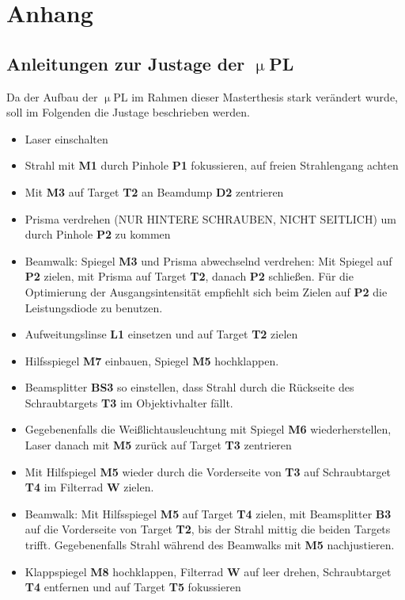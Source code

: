 \chapter{Anhang}
\section{Anleitungen zur Justage der $\upmu$PL}
\label{Justage}
Da der Aufbau der $\upmu$PL im Rahmen dieser Masterthesis stark verändert wurde, soll im Folgenden die Justage beschrieben werden.
\begin{itemize}
\item Laser einschalten
\item Strahl mit \textbf{M1} durch Pinhole \textbf{P1} fokussieren, auf freien Strahlengang achten
\item Mit \textbf{M3} auf Target \textbf{T2} an Beamdump \textbf{D2} zentrieren
\item Prisma verdrehen (NUR HINTERE SCHRAUBEN, NICHT SEITLICH) um durch Pinhole \textbf{P2} zu kommen
\item Beamwalk: Spiegel \textbf{M3} und Prisma abwechselnd verdrehen: Mit Spiegel auf \textbf{P2} zielen, mit Prisma auf Target \textbf{T2}, danach \textbf{P2} schließen. Für die Optimierung der Ausgangsintensität empfiehlt sich  beim Zielen auf \textbf{P2} die Leistungsdiode zu benutzen.
\item Aufweitungslinse \textbf{L1} einsetzen und auf Target \textbf{T2} zielen
\item Hilfsspiegel \textbf{M7} einbauen, Spiegel \textbf{M5} hochklappen.
\item Beamsplitter \textbf{BS3} so einstellen, dass Strahl durch die Rückseite des Schraubtargets \textbf{T3} im Objektivhalter fällt.
\item Gegebenenfalls die Weißlichtausleuchtung mit Spiegel \textbf{M6} wiederherstellen, Laser danach mit \textbf{M5} zurück auf Target \textbf{T3} zentrieren 
\item Mit Hilfspiegel \textbf{M5} wieder durch die Vorderseite von \textbf{T3} auf Schraubtarget \textbf{T4} im Filterrad \textbf{W} zielen. 
\item Beamwalk: Mit Hilfsspiegel \textbf{M5} auf Target \textbf{T4} zielen, mit Beamsplitter \textbf{B3} auf die Vorderseite von Target \textbf{T2}, bis der Strahl mittig die beiden Targets trifft. Gegebenenfalls Strahl während des Beamwalks mit \textbf{M5} nachjustieren.
\item Klappspiegel \textbf{M8} hochklappen, Filterrad \textbf{W} auf leer drehen, Schraubtarget \textbf{T4} entfernen und auf Target \textbf{T5} fokussieren

\end{itemize}
